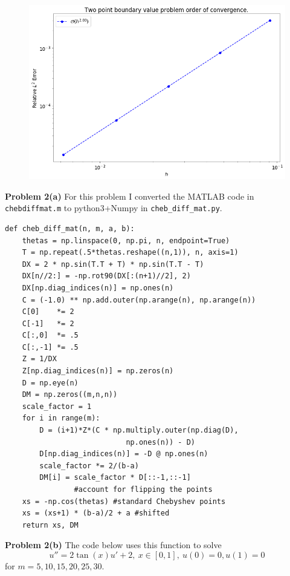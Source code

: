 \documentclass[12pt]{article}
\newcommand{\problem}[1]{\hspace{-4 ex} \large \textbf{Problem #1} }
\begin{document}
\begin{figure}[H]
	\includegraphics[width=1\textwidth]{hw03_p1b_order}
	\centering
\end{figure}
\bigbreak

\problem{2(a)} For this problem I converted the MATLAB code in \texttt{chebdiffmat.m} to python3+Numpy in \texttt{cheb\_diff\_mat.py}.

\begin{lstlisting}
def cheb_diff_mat(n, m, a, b):
	thetas = np.linspace(0, np.pi, n, endpoint=True)
	T = np.repeat(.5*thetas.reshape((n,1)), n, axis=1)
	DX = 2 * np.sin(T.T + T) * np.sin(T.T - T)
	DX[n//2:] = -np.rot90(DX[:(n+1)//2], 2)
	DX[np.diag_indices(n)] = np.ones(n)
	C = (-1.0) ** np.add.outer(np.arange(n), np.arange(n))
	C[0]    *= 2
	C[-1]   *= 2
	C[:,0]  *= .5
	C[:,-1] *= .5
	Z = 1/DX
	Z[np.diag_indices(n)] = np.zeros(n)
	D = np.eye(n)
	DM = np.zeros((m,n,n))
	scale_factor = 1
	for i in range(m):
		D = (i+1)*Z*(C * np.multiply.outer(np.diag(D), 
							np.ones(n)) - D)
		D[np.diag_indices(n)] = -D @ np.ones(n)
		scale_factor *= 2/(b-a)
		DM[i] = scale_factor * D[::-1,::-1] 
				#account for flipping the points
	xs = -np.cos(thetas) #standard Chebyshev points
	xs = (xs+1) * (b-a)/2 + a #shifted
	return xs, DM
\end{lstlisting}

\bigbreak
\problem{2(b)}
The code below uses this function to solve
$$
u'' = 2\tan(x)u' + 2, \ x \in [0,1], \ u(0)=0, u(1)=0
$$
for $m = 5, 10, 15, 20, 25, 30$.
\bigbreak
\end{document}
